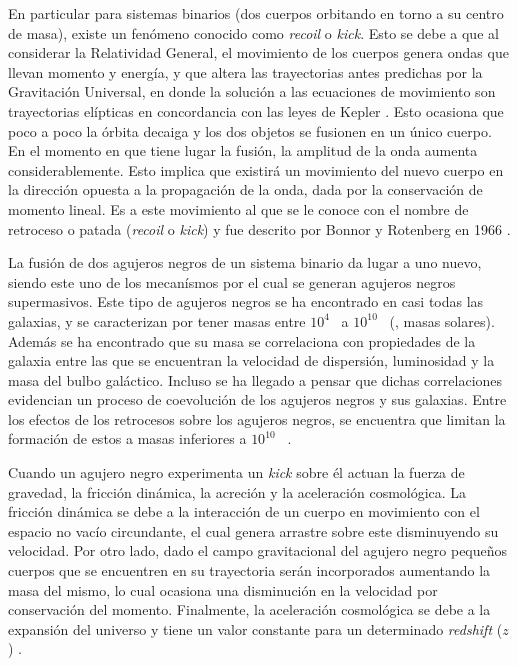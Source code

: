 	En particular para sistemas binarios (dos cuerpos orbitando en torno a su centro de masa), existe un fen\'omeno conocido como \textit{recoil} o \textit{kick}. Esto se debe a que al considerar la Relatividad General, el movimiento de los cuerpos genera ondas que llevan momento y energ\'ia, y que altera las trayectorias antes predichas por la Gravitación Universal, en donde la solución a las ecuaciones de movimiento son trayectorias elípticas en concordancia con las leyes de Kepler \cite{hughes2005black, hoyng2006gravitational, brugmann2018fundamentals}. Esto ocasiona que poco a poco la \'orbita decaiga y los dos objetos se fusionen en un \'unico cuerpo. En el momento en que tiene lugar la fusi\'on, la amplitud de la onda aumenta considerablemente. Esto implica que existir\'a un movimiento del nuevo cuerpo en la direcci\'on opuesta a la propagaci\'on de la onda, dada por la conservaci\'on de momento lineal. Es a este movimiento al que se le conoce con el nombre de retroceso o patada (\textit{recoil} o \textit{kick}) \cite{hughes2005black} y fue descrito por Bonnor y Rotenberg en 1966 \cite{bonnor1966gravitational}. 
	
	La fusi\'on de dos agujeros negros de un sistema binario da lugar a uno nuevo, siendo este uno de los mecan\'ismos por el cual se generan agujeros negros supermasivos. Este tipo de agujeros negros se ha encontrado en casi todas las galaxias, y se caracterizan por tener masas entre $10^4$ \sm\ a $10^{10}$ \sm\ (\sm, masas solares). Adem\'as se ha encontrado que su masa se correlaciona con propiedades de la galaxia entre las que se encuentran la velocidad de dispersi\'on, luminosidad y la masa del bulbo gal\'actico. Incluso se ha llegado a pensar que dichas correlaciones evidencian un proceso de coevoluci\'on de los agujeros negros y sus galaxias. Entre los efectos de los retrocesos sobre los agujeros negros, se encuentra que limitan la formaci\'on de estos a masas inferiores a $10^{10}$ \sm\ \cite{choksi2017recoiling}.
	
	Cuando un agujero negro experimenta un \textit{kick} sobre \'el actuan la fuerza de gravedad, la fricci\'on din\'amica, la acreci\'on y la aceleraci\'on cosmol\'ogica. La fricci\'on din\'amica se debe a la interacci\'on de un cuerpo en movimiento con el espacio no vac\'io circundante, el cual genera arrastre sobre este disminuyendo su velocidad. Por otro lado, dado el campo gravitacional del agujero negro pequeños cuerpos que se encuentren en su trayectoria ser\'an incorporados aumentando la masa del mismo, lo cual ocasiona una disminuci\'on en la velocidad por conservaci\'on del momento. Finalmente, la aceleraci\'on cosmol\'ogica se debe a la expansi\'on del universo y tiene un valor constante para un determinado \textit{redshift} ($z$) \cite{choksi2017recoiling}.
	

